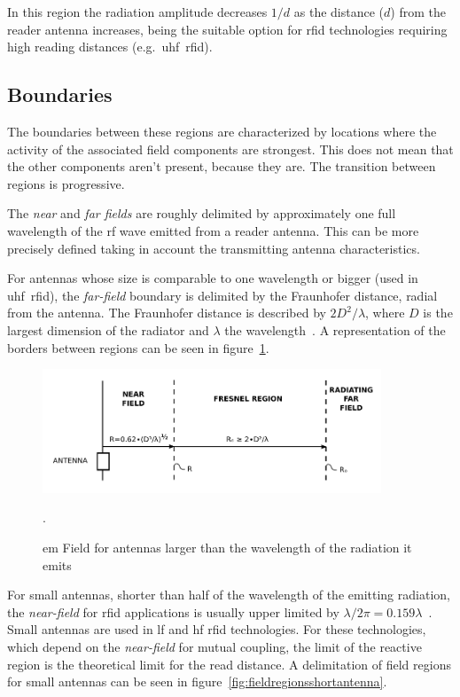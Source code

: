 In this region the radiation amplitude decreases $1/d$ as the distance ($d$) from the reader antenna increases, being the suitable option for \ac{rfid} technologies requiring high reading distances (e.g.\ \acs{uhf}~\acs{rfid}).

\subsection{Boundaries}

The boundaries between these regions are characterized by locations where the activity of the associated field components are strongest. This does not mean that the other components aren't present, because they are. The transition between regions is progressive.

The \emph{near} and \emph{far fields} are roughly delimited by approximately one full wavelength of the \ac{rf} wave emitted from a reader antenna.
This can be more precisely defined taking in account the transmitting antenna characteristics.

For antennas whose size is comparable to one wavelength or bigger (used in \acs{uhf}~\acs{rfid}), the \emph{far-field} boundary is delimited by the Fraunhofer distance, radial from the antenna. The Fraunhofer distance is described by $2D^2 / \lambda$, where $D$ is the largest dimension of the radiator and $\lambda$ the wavelength~\cite{balanisAntennaTheoryAnalysis2005}.
A representation of the borders between regions can be seen in figure~\ref{fig:fieldregionsbigantenna}.

\begin{figure}[!ht]
    \centering
    \includegraphics[width=0.9\textwidth]{./figs/02-state-of-the-art/FarNearFields-USP-4998112.pdf}
    \caption[\ac{em} Field for antennas larger than the wavelength of the radiation it emits]{\ac{em} Field for antennas larger than the wavelength of the radiation it emits~\cite{zerodamageFarFieldsVectorized1991}}. 
    \label{fig:fieldregionsbigantenna}
\end{figure}

For small antennas, shorter than half of the wavelength of the emitting radiation, the \emph{near-field} for \ac{rfid} applications is usually upper limited by $\lambda / 2\pi = 0.159\lambda$~\cite{nikitinOverviewFieldUHF2007a}.
Small antennas are used in \ac{lf} and \ac{hf} \ac{rfid} technologies.
For these technologies, which depend on the \emph{near-field} for mutual coupling, the limit of the reactive region is the theoretical limit for the read distance.
A delimitation of field regions for small antennas can be seen in figure~\ref{fig:fieldregionsshortantenna}.

